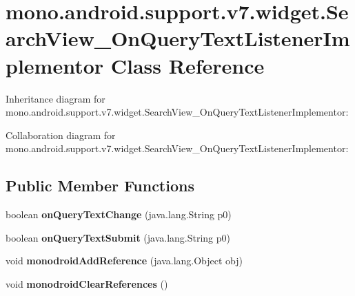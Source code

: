 \hypertarget{classmono_1_1android_1_1support_1_1v7_1_1widget_1_1_search_view___on_query_text_listener_implementor}{}\section{mono.\+android.\+support.\+v7.\+widget.\+Search\+View\+\_\+\+On\+Query\+Text\+Listener\+Implementor Class Reference}
\label{classmono_1_1android_1_1support_1_1v7_1_1widget_1_1_search_view___on_query_text_listener_implementor}


Inheritance diagram for mono.\+android.\+support.\+v7.\+widget.\+Search\+View\+\_\+\+On\+Query\+Text\+Listener\+Implementor\+:


Collaboration diagram for mono.\+android.\+support.\+v7.\+widget.\+Search\+View\+\_\+\+On\+Query\+Text\+Listener\+Implementor\+:
\subsection*{Public Member Functions}
\begin{DoxyCompactItemize}
\item 
\mbox{\label{classmono_1_1android_1_1support_1_1v7_1_1widget_1_1_search_view___on_query_text_listener_implementor_a37164a1e4575c60d88089e3d3ae36c55}} 
boolean {\bfseries on\+Query\+Text\+Change} (java.\+lang.\+String p0)
\item 
\mbox{\label{classmono_1_1android_1_1support_1_1v7_1_1widget_1_1_search_view___on_query_text_listener_implementor_ab4143af34811f748cd0c6cfcda75237a}} 
boolean {\bfseries on\+Query\+Text\+Submit} (java.\+lang.\+String p0)
\item 
\mbox{\label{classmono_1_1android_1_1support_1_1v7_1_1widget_1_1_search_view___on_query_text_listener_implementor_aa5801bb2e02637a33a8f7dd14016f759}} 
void {\bfseries monodroid\+Add\+Reference} (java.\+lang.\+Object obj)
\item 
\mbox{\label{classmono_1_1android_1_1support_1_1v7_1_1widget_1_1_search_view___on_query_text_listener_implementor_ac9620633edcb7b40810131b0604bb68d}} 
void {\bfseries monodroid\+Clear\+References} ()
\end{DoxyCompactItemize}
